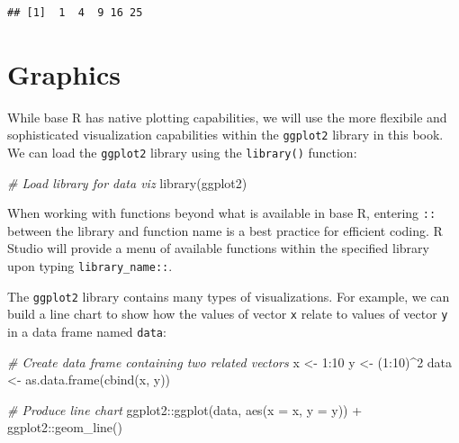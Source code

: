 \documentclass[
]{book}
\newenvironment{Shaded}{\begin{snugshade}}{\end{snugshade}}
\newcommand{\AttributeTok}[1]{\textcolor[rgb]{0.77,0.63,0.00}{#1}}
\newcommand{\CommentTok}[1]{\textcolor[rgb]{0.56,0.35,0.01}{\textit{#1}}}
\newcommand{\DecValTok}[1]{\textcolor[rgb]{0.00,0.00,0.81}{#1}}
\newcommand{\FunctionTok}[1]{\textcolor[rgb]{0.00,0.00,0.00}{#1}}
\newcommand{\NormalTok}[1]{#1}
\newcommand{\OtherTok}[1]{\textcolor[rgb]{0.56,0.35,0.01}{#1}}
\newcommand{\SpecialCharTok}[1]{\textcolor[rgb]{0.00,0.00,0.00}{#1}}
\begin{document}
\begin{verbatim}
## [1]  1  4  9 16 25
\end{verbatim}

\hypertarget{graphics}{%
\section{Graphics}\label{graphics}}

While base R has native plotting capabilities, we will use the more flexibile and sophisticated visualization capabilities within the \texttt{ggplot2} library in this book. We can load the \texttt{ggplot2} library using the \texttt{library()} function:

\begin{Shaded}
\begin{Highlighting}[]
\CommentTok{\# Load library for data viz}
\FunctionTok{library}\NormalTok{(ggplot2)}
\end{Highlighting}
\end{Shaded}

When working with functions beyond what is available in base R, entering \texttt{::} between the library and function name is a best practice for efficient coding. R Studio will provide a menu of available functions within the specified library upon typing \texttt{library\_name::}.

The \texttt{ggplot2} library contains many types of visualizations. For example, we can build a line chart to show how the values of vector \texttt{x} relate to values of vector \texttt{y} in a data frame named \texttt{data}:

\begin{Shaded}
\begin{Highlighting}[]
\CommentTok{\# Create data frame containing two related vectors}
\NormalTok{x }\OtherTok{\textless{}{-}} \DecValTok{1}\SpecialCharTok{:}\DecValTok{10}
\NormalTok{y }\OtherTok{\textless{}{-}}\NormalTok{ (}\DecValTok{1}\SpecialCharTok{:}\DecValTok{10}\NormalTok{)}\SpecialCharTok{\^{}}\DecValTok{2}
\NormalTok{data }\OtherTok{\textless{}{-}} \FunctionTok{as.data.frame}\NormalTok{(}\FunctionTok{cbind}\NormalTok{(x, y))}

\CommentTok{\# Produce line chart}
\NormalTok{ggplot2}\SpecialCharTok{::}\FunctionTok{ggplot}\NormalTok{(data, }\FunctionTok{aes}\NormalTok{(}\AttributeTok{x =}\NormalTok{ x, }\AttributeTok{y =}\NormalTok{ y)) }\SpecialCharTok{+}
\NormalTok{ggplot2}\SpecialCharTok{::}\FunctionTok{geom\_line}\NormalTok{()}
\end{Highlighting}
\end{Shaded}
\end{document}
